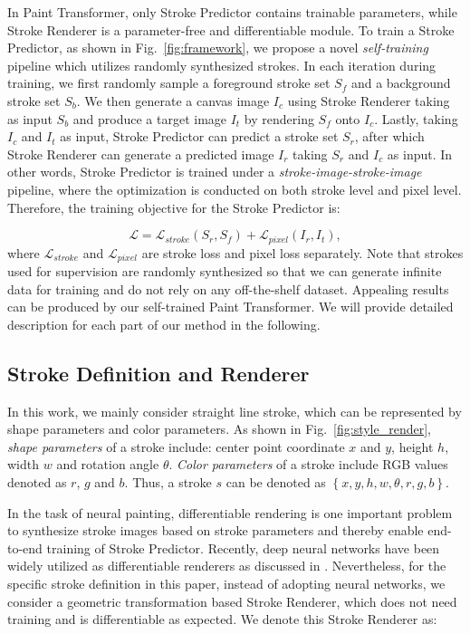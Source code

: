 \documentclass[10pt,twocolumn,letterpaper]{article}
\begin{document}
In Paint Transformer, only Stroke Predictor contains trainable parameters, while Stroke Renderer is a parameter-free and differentiable module. 
To train a Stroke Predictor, as shown in Fig.~\ref{fig:framework}, we propose a novel \emph{self-training} pipeline which utilizes randomly synthesized strokes. 
In each iteration during training, we first randomly sample a foreground stroke set $S_f$ and a background stroke set $S_b$. We then generate a canvas image $I_c$ using Stroke Renderer taking as input $S_b$ and produce a target image $I_t$ by rendering $S_f$ onto $I_c$. Lastly, taking $I_c$ and $I_t$ as input, Stroke Predictor can predict a stroke set $S_r$, after which Stroke Renderer can generate a predicted image $I_r$ taking $S_r$ and $I_c$ as input. 
In other words, Stroke Predictor is trained under a \emph{stroke-image-stroke-image} pipeline, where the optimization is conducted on both stroke level and pixel level.
Therefore, the training objective for the Stroke Predictor is:

\begin{equation}
\mathcal{L} = \mathcal{L}_{stroke}(S_r, S_f) + \mathcal{L}_{pixel}(I_r, I_t),
\end{equation}
where $\mathcal{L}_{stroke}$ and $\mathcal{L}_{pixel}$ are stroke loss and pixel loss separately.
Note that strokes used for supervision are randomly synthesized so that we can generate infinite data for training and do not rely on any off-the-shelf dataset.
Appealing results can be produced by our self-trained Paint Transformer. We will provide detailed description for each part of our method in the following.








\subsection{Stroke Definition and Renderer}

In this work, we mainly consider straight line stroke, which can be represented by shape parameters and color parameters.
As shown in Fig.~\ref{fig:style_render}, \emph{shape parameters} of a stroke include: center point coordinate $x$ and $y$, height $h$, width $w$ and rotation angle $\theta$.
\emph{Color parameters} of a stroke include RGB values denoted as $r$, $g$ and $b$.
Thus, a stroke $s$ can be denoted as $\left \{x, y, h, w, \theta, r, g, b  \right \}$.

In the task of neural painting, differentiable rendering is one important problem to synthesize stroke images based on stroke parameters and thereby enable end-to-end training of Stroke Predictor. 
Recently, deep neural networks have been widely utilized as differentiable renderers as discussed in \cite{kato2020differentiable}. 
Nevertheless, for the specific stroke definition in this paper, instead of adopting neural networks, we consider a geometric transformation based Stroke Renderer, which does not need training and is differentiable as expected. We denote this Stroke Renderer as:
\end{document}
